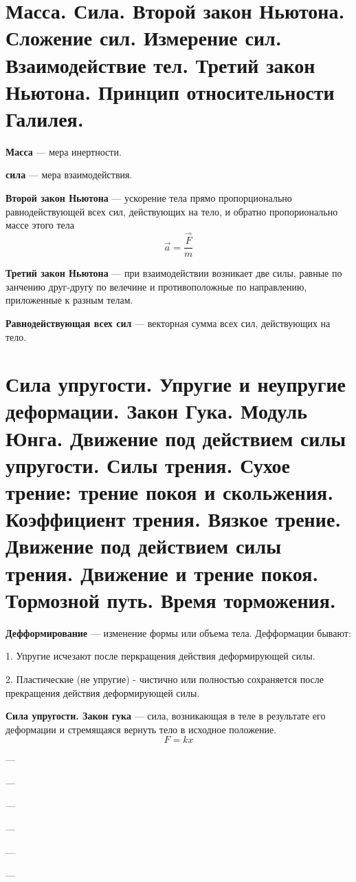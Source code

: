 \documentclass{report}
\begin{document}
\part{ Масса. 
Сила. 
Второй закон Ньютона. 
Сложение сил. 
Измерение сил. 
Взаимодействие тел. 
Третий закон Ньютона. 
Принцип относительности Галилея.}

{\bf Масса} —
мера инертности.

{\bf сила} —
мера взаимодействия.

{\bf Второй закон Ньютона} —
ускорение тела прямо пропорционально равнодействующей всех сил, действующих на тело, и обратно
пропорионально массе этого тела
$$
\overrightarrow{a}=\frac{\overrightarrow{F}}{m}
$$

{\bf Третий закон Ньютона} —
при взаимодействии возникает две силы, равные по занчению друг-другу по велечине и противоположные
по направлению, приложенные к разным телам.

{\bf Равнодействующая всех сил} —
векторная сумма всех сил, действующих на тело.

\part{Сила упругости. 
Упругие и неупругие деформации. 
Закон Гука. 
Модуль Юнга. 
Движение под действием силы упругости. 
Силы трения. 
Сухое трение: трение покоя и скольжения. 
Коэффициент трения. 
Вязкое трение. 
Движение под действием силы трения. 
Движение и трение покоя. 
Тормозной путь. 
Время торможения.}

{\bf Дефформирование} —
изменение формы или объема тела. Дефформации бывают:

1. Упругие исчезают после перкращения действия деформирующей силы.

2. Пластические (не упругие) - чистично или полностью сохраняется после прекращения действия 
деформирующей силы.

{\bf Сила упругости. Закон гука} —
сила, возникающая в теле в результате его деформации и стремящаяся вернуть тело в исходное положение.
$$
F=kx
$$

{\bf } —

{\bf } —

{\bf } —

{\bf } —

{\bf } —

{\bf } —
\end{document}
